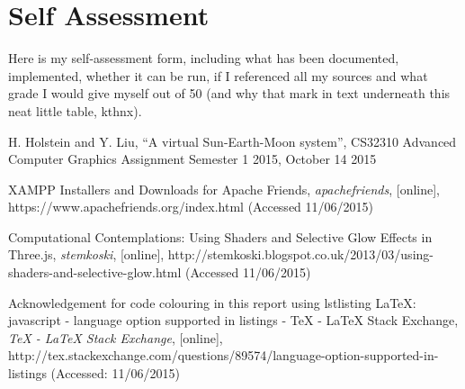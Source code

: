 \documentclass[12pt]{article}
\begin{document}
\clearpage

\section{Self Assessment}
Here is my self-assessment form, including what has been documented, implemented, whether it can be run, if I referenced all my sources and what grade I would give myself out of 50 (and why that mark in text underneath this neat little table, kthnx).


\clearpage


\begin{thebibliography}{1}

 H. Holstein and Y. Liu, ``A virtual Sun-Earth-Moon system'', CS32310 Advanced Computer Graphics Assignment Semester 1 2015, October 14 2015

 XAMPP Installers and Downloads for Apache Friends, {\em apachefriends}, [online], https://www.apachefriends.org/index.html (Accessed 11/06/2015)

 Computational Contemplations: Using Shaders and Selective Glow Effects in Three.js, {\em stemkoski}, [online],
http://stemkoski.blogspot.co.uk/2013/03/using-shaders-and-selective-glow.html (Accessed 11/06/2015)

  Acknowledgement for code colouring in this report using lstlisting LaTeX: javascript - language option supported in listings - TeX - LaTeX Stack Exchange, {\em TeX - LaTeX Stack Exchange}, [online], http://tex.stackexchange.com/questions/89574/language-option-supported-in-listings (Accessed: 11/06/2015)

\end{thebibliography}
\end{document}
